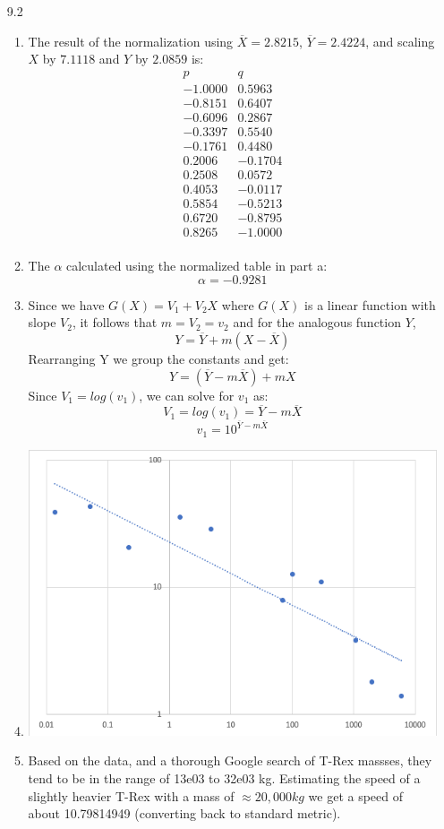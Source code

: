 \documentclass[11pt,a4paper]{article}
\begin{document}
		\begin{itemize}
			\item[9.2]
				\begin{enumerate} [label={\alph*)}]
					\item The result of the normalization using $\overline{X}=2.8215$, $\overline{Y}=2.4224$, and scaling $X$ by $7.1118$ and $Y$ by $2.0859$ is:
						$$\begin{array}{cc}
							p & q \\ \hline
							-1.0000  & 0.5963 \\
							-0.8151  & 0.6407 \\
							-0.6096  & 0.2867 \\
							-0.3397  & 0.5540 \\
							-0.1761  & 0.4480 \\
							0.2006 & -0.1704 \\
							0.2508  & 0.0572 \\
							0.4053   & -0.0117 \\
							0.5854  & -0.5213 \\
							0.6720  & -0.8795 \\
							0.8265  & -1.0000 \\
							
						
						\end{array}$$
					\item The $\alpha$ calculated using the normalized table in part a: $$\alpha = -0.9281$$
					\item Since we have $G(X)=V_1 + V_2 X$ where $G(X)$ is a linear function with slope $V_2$, it follows that $m=V_2=v_2$ and for the analogous function $Y$,
					$$Y=\overline{Y} + m(X-\overline{X})$$
					Rearranging Y we group the constants and get:
					$$Y=(\overline{Y}-m\overline{X})+mX$$ Since $V_1=log(v_1)$, we can solve for $v_1$ as:
					$$V_1= log(v_1)=\overline{Y}-m\overline{X}$$
					$$v_1=10^{\overline{Y}-m\overline{X}}$$
					\item
						\begin{center}
							\includegraphics[width=0.7\linewidth]{plot}
						\end{center}
					\item Based on the data, and a thorough Google search of T-Rex massses, they tend to be in the range of 13e03 to 32e03 kg. Estimating the speed of a slightly heavier T-Rex with a mass of $\approx 20,000kg$ we get a speed of about 10.79814949 (converting back to standard metric).
 

\end{enumerate}
\end{itemize}
\end{document}
